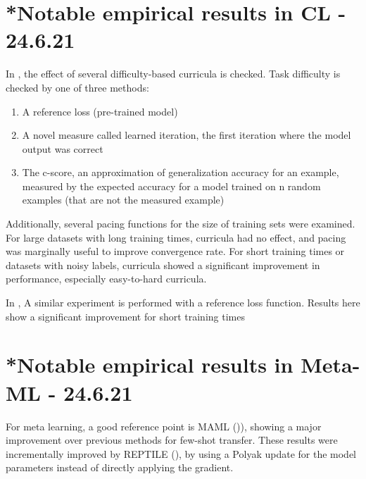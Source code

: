 \documentclass[letterpaper]{article}
\theoremstyle{definition}
\begin{document}
\section{*Notable empirical results in CL - 24.6.21} \label{sec:empirical-cl}

In \cite{Anonymous2021}, the effect of several difficulty-based curricula is checked.
Task difficulty is checked by one of three methods:
\begin{enumerate}
	\item A reference loss (pre-trained model)
	\item A novel measure called learned iteration, the first iteration where the model output was correct
	\item The c-score, an approximation of generalization accuracy for an example, measured by the expected accuracy for a model trained on n random examples (that are not the measured example)
\end{enumerate}
Additionally, several pacing functions for the size of training sets were examined.
For large datasets with long training times, curricula had no effect, and pacing was marginally useful to improve convergence rate. For short training times or datasets with noisy labels, curricula showed a significant improvement in performance, especially easy-to-hard curricula.

In \cite{Hacohen2019}, A similar experiment is performed with a reference loss function. Results here show a significant improvement for short training times


\section{*Notable empirical results in Meta-ML - 24.6.21} \label{sec:empirical-meta}

For meta learning, a good reference point is MAML (\cite{Finn2017})), showing a major improvement over previous methods for few-shot transfer.
These results were incrementally improved by REPTILE (\cite{Nichol2018}), by using a Polyak update for the model parameters instead of directly applying the gradient.
\end{document}
